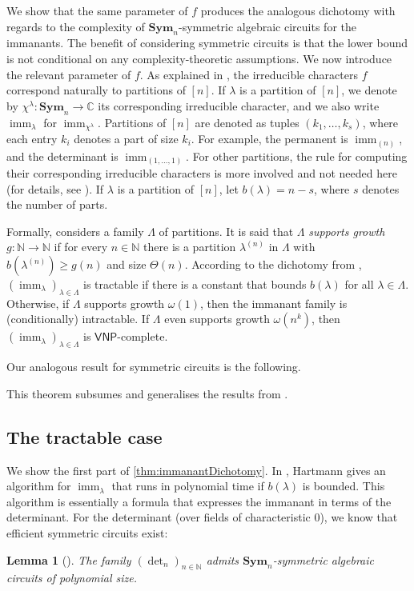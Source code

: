 \documentclass[10pt,a4paper]{article}
\theoremstyle{definition}
\theoremstyle{plain}
\newtheorem{lemma}[definition]{Lemma}
\theoremstyle{remark}
\newcommand{\Sym}{\mathbf{Sym}}
\newcommand{\bbN}{\mathbb{N}}
\DeclareMathOperator{\imm}{imm}
\newcommand{\VNP}{\mathsf{VNP}}
\begin{document}
	We show that the same parameter of $f$ produces the analogous dichotomy with regards to the complexity of $\Sym_n$-symmetric algebraic circuits for the immanants. The benefit of considering symmetric circuits is that the lower bound is not conditional on any complexity-theoretic assumptions. 
	We now introduce the relevant parameter of $f$. As explained in \cite{curticapean2021full}, the irreducible characters $f$ correspond naturally to partitions of $[n]$. If $\lambda$ is a partition of $[n]$, we denote by $\chi^{\lambda}\colon \Sym_n \to \mathbb{C}$ its corresponding irreducible character, and we also write $\imm_{\lambda}$ for $\imm_{\chi^\lambda}$. Partitions of $[n]$ are denoted as tuples $(k_1,\dots ,k_s)$, where each entry $k_i$ denotes a part of size $k_i$.
	For example, the permanent is $\imm_{(n)}$, and the determinant is $\imm_{(1,\dots ,1)}$. For other partitions, the rule for computing their corresponding irreducible characters is more involved and not needed here (for details, see \cite{curticapean2021full}).
	 If $\lambda$ is a partition of $[n]$, let $b(\lambda) = n-s$, where $s$ denotes the number of parts. 
	
	Formally, \cite{curticapean2021full} considers a family $\Lambda$ of partitions. It is said that $\Lambda$ \emph{supports growth} $g \colon \bbN \to \bbN$ if for every $n \in \bbN$ there is a partition $\lambda^{(n)}$ in $\Lambda$ with $b(\lambda^{(n)}) \geq g(n)$ and size $\Theta(n)$. According to the dichotomy from \cite{curticapean2021full}, $(\imm_{\lambda})_{\lambda \in \Lambda}$ is tractable if there is a constant that bounds $b(\lambda)$ for all $\lambda \in \Lambda$. Otherwise, if $\Lambda$ supports growth $\omega(1)$, then the immanant family is (conditionally) intractable. If $\Lambda$ even supports growth $\omega(n^k)$, then $(\imm_{\lambda})_{\lambda \in \Lambda}$ is $\VNP$-complete.
	
Our analogous result for symmetric circuits is the following.
\immanantDichotomy*

This theorem subsumes and generalises the results from \cite{dawar_symmetric_2025}. 
	 
	


\subsection{The tractable case}

We show the first part of \cref{thm:immanantDichotomy}.
In \cite{hartmann1985complexity}, Hartmann gives an algorithm for $\imm_{\lambda}$ that runs in polynomial time if $b(\lambda)$ is bounded. This algorithm is essentially a formula that expresses the immanant in terms of the determinant. For the determinant (over fields of characteristic 0), we know that efficient symmetric circuits exist: 
\begin{lemma}[\cite{dawar_symmetric_2025}]
	\label{lem:determinantEfficient}
	The family $(\det_n)_{n \in \bbN}$ admits $\Sym_n$-symmetric algebraic circuits of polynomial size. 
\end{lemma}	
\end{document}
